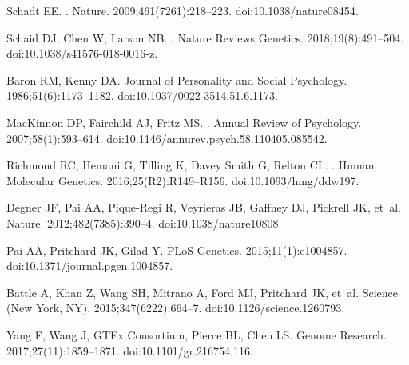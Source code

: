 \documentclass[10pt,letterpaper]{article}
\begin{document}
\begin{thebibliography}{10}

Schadt EE.
.
\newblock Nature. 2009;461(7261):218--223.
\newblock doi:{10.1038/nature08454}.

Schaid DJ, Chen W, Larson NB.
.
\newblock Nature Reviews Genetics. 2018;19(8):491--504.
\newblock doi:{10.1038/s41576-018-0016-z}.

Baron RM, Kenny DA.
\newblock Journal of Personality and Social Psychology. 1986;51(6):1173--1182.
\newblock doi:{10.1037/0022-3514.51.6.1173}.

MacKinnon DP, Fairchild AJ, Fritz MS.
.
\newblock Annual Review of Psychology. 2007;58(1):593--614.
\newblock doi:{10.1146/annurev.psych.58.110405.085542}.

Richmond RC, Hemani G, Tilling K, {Davey Smith} G, Relton CL.
.
\newblock Human Molecular Genetics. 2016;25(R2):R149--R156.
\newblock doi:{10.1093/hmg/ddw197}.

Degner JF, Pai AA, Pique-Regi R, Veyrieras JB, Gaffney DJ, Pickrell JK, et~al.
\newblock Nature. 2012;482(7385):390--4.
\newblock doi:{10.1038/nature10808}.

Pai AA, Pritchard JK, Gilad Y.
\newblock PLoS Genetics. 2015;11(1):e1004857.
\newblock doi:{10.1371/journal.pgen.1004857}.

Battle A, Khan Z, Wang SH, Mitrano A, Ford MJ, Pritchard JK, et~al.
\newblock Science (New York, NY). 2015;347(6222):664--7.
\newblock doi:{10.1126/science.1260793}.

Yang F, Wang J, {GTEx Consortium}, Pierce BL, Chen LS.
\newblock Genome Research. 2017;27(11):1859--1871.
\newblock doi:{10.1101/gr.216754.116}.


\end{thebibliography}
\end{document}
